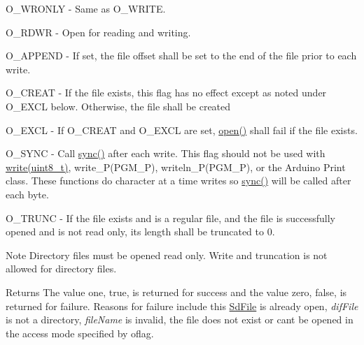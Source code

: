 O\+\_\+\+W\+R\+O\+N\+L\+Y -\/ Same as O\+\_\+\+W\+R\+I\+T\+E.

O\+\_\+\+R\+D\+W\+R -\/ Open for reading and writing.

O\+\_\+\+A\+P\+P\+E\+N\+D -\/ If set, the file offset shall be set to the end of the file prior to each write.

O\+\_\+\+C\+R\+E\+A\+T -\/ If the file exists, this flag has no effect except as noted under O\+\_\+\+E\+X\+C\+L below. Otherwise, the file shall be created

O\+\_\+\+E\+X\+C\+L -\/ If O\+\_\+\+C\+R\+E\+A\+T and O\+\_\+\+E\+X\+C\+L are set, \hyperlink{class_sd_file_a9e211ac14784f48aebb213194336f8cc}{open()} shall fail if the file exists.

O\+\_\+\+S\+Y\+N\+C -\/ Call \hyperlink{class_sd_file_a742d64ca964583ac3a92b31f0eba5e14}{sync()} after each write. This flag should not be used with \hyperlink{class_sd_file_a67267a4b63d03a16e099195935613006}{write(uint8\+\_\+t)}, write\+\_\+\+P(\+P\+G\+M\+\_\+\+P), writeln\+\_\+\+P(\+P\+G\+M\+\_\+\+P), or the Arduino Print class. These functions do character at a time writes so \hyperlink{class_sd_file_a742d64ca964583ac3a92b31f0eba5e14}{sync()} will be called after each byte.

O\+\_\+\+T\+R\+U\+N\+C -\/ If the file exists and is a regular file, and the file is successfully opened and is not read only, its length shall be truncated to 0.

\begin{DoxyNote}{Note}
Directory files must be opened read only. Write and truncation is not allowed for directory files.
\end{DoxyNote}
\begin{DoxyReturn}{Returns}
The value one, true, is returned for success and the value zero, false, is returned for failure. Reasons for failure include this \hyperlink{class_sd_file}{Sd\+File} is already open, {\itshape dif\+File} is not a directory, {\itshape file\+Name} is invalid, the file does not exist or can\textquotesingle{}t be opened in the access mode specified by oflag. 
\end{DoxyReturn}
\hypertarget{class_sd_file_afe1d8ce70ef58ee5967005047064167c}{}
